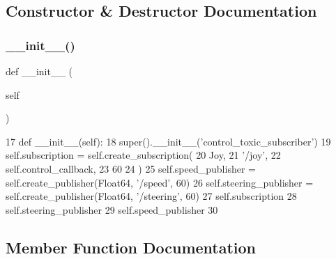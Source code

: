 \subsection{Constructor \& Destructor Documentation}
\mbox{\label{classtoxic__hardware_1_1controller_1_1ControlSubscriber_ae64f0875afe3067b97ba370b354b9213}} 
\subsubsection{\texorpdfstring{\+\_\+\+\_\+init\+\_\+\+\_\+()}{\_\_init\_\_()}}
{\footnotesize\ttfamily def \+\_\+\+\_\+init\+\_\+\+\_\+ (\begin{DoxyParamCaption}\item[{}]{self }\end{DoxyParamCaption})}


\begin{DoxyCode}
17     \textcolor{keyword}{def }\_\_init\_\_(self):
18         super().\_\_init\_\_(\textcolor{stringliteral}{'control\_toxic\_subscriber'})
19         self.subscription = self.create\_subscription(
20                 Joy,
21                 \textcolor{stringliteral}{'/joy'},
22                 self.control\_callback,
23                 60
24                 )
25         self.speed\_publisher = self.create\_publisher(Float64, \textcolor{stringliteral}{'/speed'}, 60)
26         self.steering\_publisher = self.create\_publisher(Float64, \textcolor{stringliteral}{'/steering'}, 60)
27         self.subscription
28         self.steering\_publisher
29         self.speed\_publisher
30 
\end{DoxyCode}


\subsection{Member Function Documentation}
\mbox{\label{classtoxic__hardware_1_1controller_1_1ControlSubscriber_a33e86027586e42bbaff819e19bef44d7}} 
